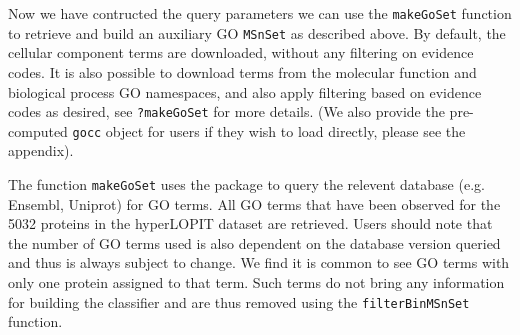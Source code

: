 \begin{knitrout}
\color{fgcolor}\begin{kframe}
\begin{alltt}
 \hlkwb{<-} \hlstd{(} \hlstd{=} \hlstd{(}\hlstd{,} \hlstd{))}
\end{alltt}
\end{kframe}
\end{knitrout}

Now we have contructed the query parameters we can use the
\texttt{makeGoSet} function to retrieve and build an auxiliary GO
\texttt{MSnSet} as described above. By default, the cellular component
terms are downloaded, without any filtering on evidence codes. It is
also possible to download terms from the molecular function and
biological process GO namespaces, and also apply filtering based on
evidence codes as desired, see \texttt{?makeGoSet} for more details. 
(We also provide the pre-computed \texttt{gocc} object for users
if they wish to load directly, please see the appendix).

\begin{knitrout}
\color{fgcolor}\begin{kframe}
\begin{alltt}
 \hlkwb{<-}     \hlstd{=} \hlstd{)}
\end{alltt}
\end{kframe}
\end{knitrout}

The function \texttt{makeGoSet} uses the  package to
query the relevent database (e.g. Ensembl, Uniprot) for GO terms. All
GO terms that have been observed for the 5032 proteins in the
hyperLOPIT dataset are retrieved. Users should note that the number of
GO terms used is also dependent on the database version queried and
thus is always subject to change. We find it is common to see GO terms
with only one protein assigned to that term. Such terms do not bring
any information for building the classifier and are thus removed using
the \texttt{filterBinMSnSet} function.

\begin{knitrout}
\color{fgcolor}\begin{kframe}
\begin{alltt}
 \hlkwb{<-} 
\end{alltt}
\end{kframe}
\end{knitrout}

